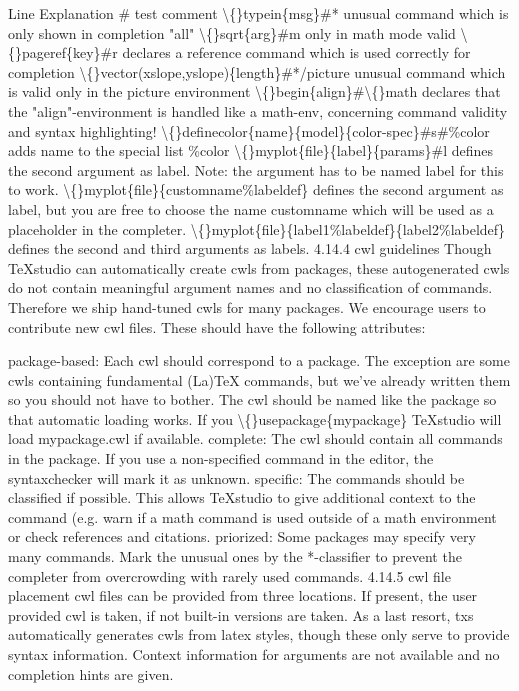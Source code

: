 \documentclass{article}
\begin{document}
	Line	Explanation
	\# test	comment
	\textbackslash\{\}typein\{msg\}\#*	unusual command which is only shown in completion "all"
	\textbackslash\{\}sqrt\{arg\}\#m	only in math mode valid
	\textbackslash\{\}pageref\{key\}\#r	declares a reference command which is used correctly for completion
	\textbackslash\{\}vector(xslope,yslope)\{length\}\#*/picture	unusual command which is valid only in the picture environment
	\textbackslash\{\}begin\{align\}\#\textbackslash\{\}math	declares that the "align"-environment is handled like a math-env, concerning command validity and syntax highlighting!
	\textbackslash\{\}definecolor\{name\}\{model\}\{color-spec\}\#s\#\%color	adds name to the special list \%color
	\textbackslash\{\}myplot\{file\}\{label\}\{params\}\#l	defines the second argument as label. Note: the argument has to be named label for this to work.
	\textbackslash\{\}myplot\{file\}\{customname\%labeldef\}	defines the second argument as label, but you are free to choose the name customname which will be used as a placeholder in the completer.
	\textbackslash\{\}myplot\{file\}\{label1\%labeldef\}\{label2\%labeldef\}	defines the second and third arguments as labels.
	4.14.4 cwl guidelines
	Though TeXstudio can automatically create cwls from packages, these autogenerated cwls do not contain meaningful argument names and no classification of commands. Therefore we ship hand-tuned cwls for many packages. We encourage users to contribute new cwl files. These should have the following attributes:
	
	package-based: Each cwl should correspond to a package. The exception are some cwls containing fundamental (La)TeX commands, but we've already written them so you should not have to bother. The cwl should be named like the package so that automatic loading works. If you \textbackslash\{\}usepackage\{mypackage\} TeXstudio will load mypackage.cwl if available.
	complete: The cwl should contain all commands in the package. If you use a non-specified command in the editor, the syntaxchecker will mark it as unknown.
	specific: The commands should be classified if possible. This allows TeXstudio to give additional context to the command (e.g. warn if a math command is used outside of a math environment or check references and citations.
	priorized: Some packages may specify very many commands. Mark the unusual ones by the *-classifier to prevent the completer from overcrowding with rarely used commands.
	4.14.5 cwl file placement
	cwl files can be provided from three locations. If present, the user provided cwl is taken, if not built-in versions are taken. As a last resort, txs automatically generates cwls from latex styles, though these only serve to provide syntax information. Context information for arguments are not available and no completion hints are given.
	
\end{document}
